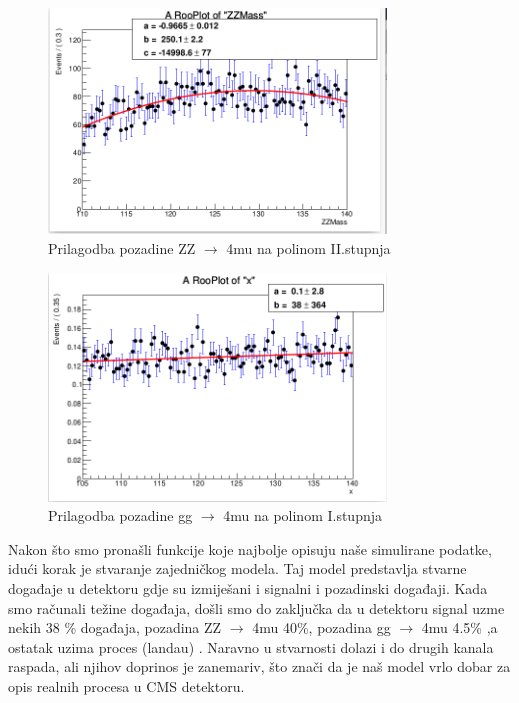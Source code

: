\documentclass[12pt,a4paper,oneside]{article}
\begin{document}
\begin{linenumbers}
		\begin{figure}[h!]
			\centering
			\includegraphics[width=0.8\textwidth]{background-zz.png}
			\caption[Saturn viđen u ultraljubičastom svjetlu.]{\label{sl:background-zz} Prilagodba pozadine ZZ $\rightarrow$ 4mu na polinom II.stupnja}
		\end{figure}
	
		\begin{figure}[h!]
			\centering
			\includegraphics[width=0.8\textwidth]{background-gg.png}
			\caption[Saturn viđen u ultraljubičastom svjetlu.]{\label{sl:background-gg} Prilagodba pozadine gg $\rightarrow$ 4mu na polinom I.stupnja}
		\end{figure}
	
		Nakon što smo pronašli funkcije koje najbolje opisuju naše simulirane podatke, idući korak je stvaranje zajedničkog modela. Taj model predstavlja stvarne događaje u detektoru gdje su izmiješani i signalni i pozadinski događaji. Kada smo računali težine događaja, došli smo do zaključka da u detektoru signal uzme nekih 38 \% događaja, pozadina ZZ $\rightarrow$ 4mu 40\%, pozadina gg $\rightarrow$ 4mu 4.5\% ,a ostatak uzima proces (landau) . Naravno u stvarnosti dolazi i do drugih kanala raspada, ali njihov doprinos je zanemariv, što znači da je naš model vrlo dobar za opis realnih procesa u CMS detektoru.
		

\end{linenumbers}
\end{document}
